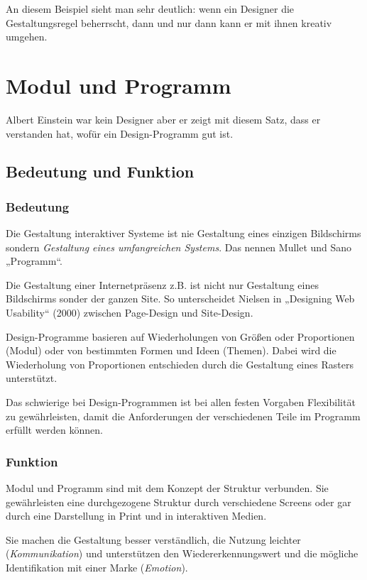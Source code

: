 An diesem Beispiel sieht man sehr deutlich: wenn ein Designer die Gestaltungsregel beherrscht, dann und nur dann kann er mit ihnen kreativ umgehen.

\section{Modul und Programm}
Albert Einstein war kein Designer aber er zeigt mit diesem Satz, dass er verstanden hat, wofür ein Design-Programm gut ist.
\subsection{Bedeutung und Funktion}
\subsubsection*{Bedeutung}
Die Gestaltung interaktiver Systeme ist nie Gestaltung eines einzigen Bildschirms sondern \emph{Gestaltung eines umfangreichen Systems}. Das nennen Mullet und Sano „Programm“.

Die Gestaltung einer Internetpräsenz  z.B. ist nicht nur Gestaltung eines Bildschirms sonder der ganzen Site. So unterscheidet Nielsen in „Designing Web Usability“ (2000) zwischen Page-Design und Site-Design.

Design-Programme basieren auf Wiederholungen von Größen oder Proportionen (Modul) oder von bestimmten Formen und Ideen (Themen). Dabei wird die Wiederholung von Proportionen entschieden durch die Gestaltung eines Rasters unterstützt.

Das schwierige bei Design-Programmen ist bei allen festen Vorgaben Flexibilität zu gewährleisten, damit die Anforderungen der verschiedenen Teile im Programm erfüllt werden können. 

\subsubsection*{Funktion}
Modul und Programm sind mit dem Konzept der Struktur verbunden. Sie gewährleisten eine durchgezogene Struktur durch verschiedene Screens oder gar durch eine Darstellung in Print und in interaktiven Medien.

Sie machen die Gestaltung besser verständlich, die Nutzung leichter (\emph{Kommunikation}) und unterstützen den Wiedererkennungswert und die mögliche Identifikation mit einer Marke (\emph{Emotion}).

